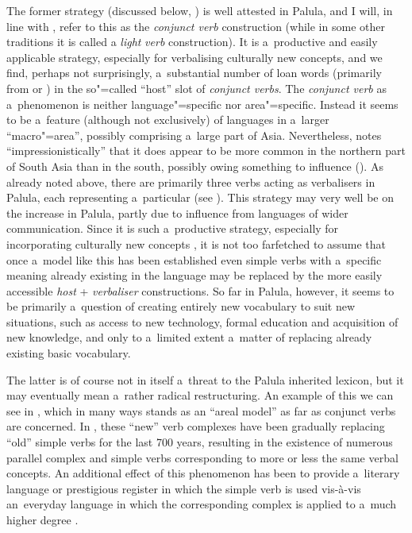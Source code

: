 The former strategy (discussed below, ) is well attested in Palula, and I will, in line with \citet[326]{masica1991}, refer to this as the \textit{conjunct verb} construction (while in some other traditions it is called a \textit{light} \textit{verb} construction). It is a~productive and easily applicable strategy, especially for verbalising culturally new concepts, and we find, perhaps not surprisingly, a~substantial number of loan words (primarily from \iliUrdu or \iliPashto) in the so"=called ``host'' slot of \textit{conjunct verbs}. The \textit{conjunct verb} as a~phenomenon is neither language"=specific nor area"=specific. Instead it seems to be a~feature (although not exclusively) of languages in a~larger ``macro"=area'', possibly comprising a~large part of Asia. Nevertheless, \citeauthor{masica1991} notes ``impressionistically'' that it does appear to be more common in the northern part of South Asia than in the south, possibly owing something to \iliPersian influence (\citeyear[368]{masica1991}). As already noted above, there are primarily three verbs acting as verbalisers in Palula, each representing a~particular  (see ). This strategy may very well be on the increase in Palula, partly due to influence from languages of wider communication. Since it is such a~productive strategy, especially for incorporating culturally new concepts \citep[85]{gambhir1993}, it is not too farfetched to assume that once a~model like this has been established even simple verbs with a~specific meaning already existing in the language may be replaced by the more easily accessible \textit{host} + \textit{verbaliser} constructions. So far in Palula, however, it seems to be primarily a~question of creating entirely new vocabulary to suit new situations, such as access to new technology, formal education and acquisition of new knowledge, and only to a~limited extent a~matter of replacing already existing basic vocabulary. 



The latter is of course not in itself a~threat to the Palula inherited lexicon, but it may eventually mean a~rather radical restructuring. An example of this we can see in \iliPersian, which in many ways stands as an ``areal model'' as far as conjunct verbs are concerned. In \iliPersian, these ``new'' verb complexes have been gradually replacing ``old'' simple verbs for the last 700 years, resulting in the existence of numerous parallel complex and simple verbs corresponding to more or less the same verbal concepts. An additional effect of this phenomenon has been to provide a~literary language or prestigious register in which the simple verb is used vis-à-vis an~everyday language in which the corresponding complex  is applied to a~much higher degree \citep[1369]{follietal2005}. 



